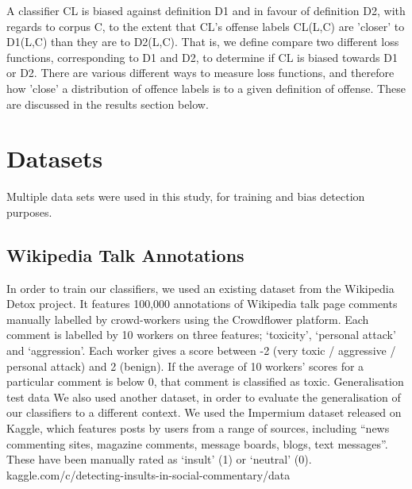 \documentclass[runningheads,a4paper]{llncs}
\begin{document}
A classifier CL is biased​ against definition D1 and in favour of definition D2, with regards to corpus C, to the extent that CL's offense labels CL(L,C) are 'closer' to D1(L,C) than they are to D2(L,C). That is, we define compare two different loss functions, corresponding to D1 and D2, to determine if CL is biased towards D1 or D2. There are various different ways to measure loss functions, and therefore how 'close' a distribution of offence labels is to a given definition of offense. These are discussed in the results section below.



 
\section{Datasets}
Multiple data sets were used in this study, for training and bias detection purposes.

\subsection{Wikipedia Talk Annotations}

In order to train our classifiers, we used an existing dataset from the Wikipedia Detox project. It features 100,000 annotations of Wikipedia talk page comments manually labelled by crowd-workers using the Crowdflower platform. Each comment is labelled by 10 workers on three features; ‘toxicity’, ‘personal attack’ and ‘aggression’. Each worker gives a score between -2 (very toxic / aggressive / personal attack) and 2 (benign). If the average of 10 workers’ scores for a particular comment is below 0, that comment is classified as toxic.  
Generalisation test data
We also used another dataset, in order to evaluate the generalisation of our classifiers to a different context. We used the Impermium dataset released on Kaggle, which features posts by users from a range of sources, including “news commenting sites, magazine comments, message boards, blogs, text messages”. These have been manually rated as ‘insult’ (1) or ‘neutral’ (0). kaggle.com/c/detecting-insults-in-social-commentary/data
\end{document}
